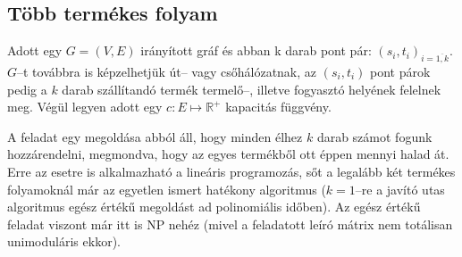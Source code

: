 \subsection{Több termékes folyam}

Adott egy $G=(V,E)$ irányított gráf és abban k darab pont pár:
$(s_i,t_i)_{i = \overline{1,k}}$. $G$--t továbbra is képzelhetjük út-- vagy
csőhálózatnak, az $(s_i, t_i)$ pont párok pedig a $k$ darab szállítandó termék
termelő--, illetve fogyasztó helyének felelnek meg. Végül legyen adott egy $c:E
\mapsto \mathbb{R}^+$ kapacitás függvény.

A feladat egy megoldása abból áll, hogy minden élhez $k$ darab számot fogunk
hozzárendelni, megmondva, hogy az egyes termékből ott éppen mennyi halad át.
Erre az esetre is alkalmazható a lineáris programozás, sőt a legalább két
termékes folyamoknál már az egyetlen ismert hatékony algoritmus ($k=1$--re a
javító utas algoritmus egész értékű megoldást ad polinomiális időben). Az egész
értékű feladat viszont már itt is NP nehéz (mivel a feladatott leíró mátrix nem
totálisan unimoduláris ekkor).

